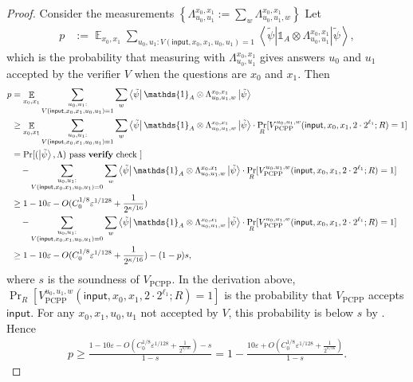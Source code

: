 \documentclass[10pt,a4paper]{article}
\def\V{\CMcal{V}}
\theoremstyle{plain}
\theoremstyle{definition}
\newcommand {\set} [1] {\ensuremath{ \left\lbrace #1 \right\rbrace }}
\newcommand {\bra} [1] {\ensuremath{ \left\langle #1 \right| }}
\newcommand {\ket} [1] {\ensuremath{ \left| #1 \right\rangle }}
\DeclareMathOperator*{\bigE}{\mathbb{E}}
\newcommand {\id} {\ensuremath{\mathds{1}}}
\newcommand{\ep} {\ensuremath{\varepsilon}}
\newcommand{\x}{\otimes}
\newcommand{\1}{\mathbb{1}} %
\newcommand{\tpsi}{\tilde{\psi}}
\newcommand{\PCPP}{\mathrm{PCPP}}
\newcommand{\ipt}{\mathsf{input}}
\begin{document}
\begin{proof}
Consider the measurements $\set{ \Lambda^{x_0, x_1}_{u_0, u_1} := \sum_w \Lambda^{x_0,x_1}_{u_0,u_1,w}}$
Let
\begin{align*}
	p &:= \bigE_{x_0,x_1} \sum_{u_0, u_1: V(\ipt, x_0,x_1,u_0,u_1)=1} \bra{\tpsi} \id_A \x \Lambda^{x_0,x_1}_{u_0,u_1} \ket{\tpsi},
\end{align*}
which is the probability that measuring with $\Lambda^{x_0, x_1}_{u_0, u_1}$ gives answers 
$u_0$ and $u_1$ accepted by the verifier $V$ when the questions are $x_0$ and $x_1$.
Then
\begin{align*}
	 p &= \bigE_{x_0,x_1} \sum_{\substack{u_0,u_1: \\ V(\ipt, x_0,x_1,u_0,u_1)=1}}
	 \sum_{w}
	   \bra{\tpsi} \id_A \x \Lambda^{x_0,x_1}_{u_0,u_1,w} \ket{\tpsi} \\
	&\geq \bigE_{x_0,x_1} \sum_{\substack{u_0,u_1: \\ V(\ipt, x_0,x_1,u_0,u_1)=1}}
	 \sum_{w} \bra{\tpsi} \id_A \x \Lambda^{x_0,x_1}_{u_0,u_1,w} \ket{\tpsi} \cdot 
	\Pr_R[V_{\PCPP}^{u_0,u_1,w}(\ipt,x_0,x_1,2\cdot 2^{\ell_1}; R)=1]\\
	&= \Pr[(\ket{\tpsi}, \Lambda) \text{ pass \textbf{verify} check }]  \\
	&\quad-  \sum_{\substack{u_0,u_1: \\V(\ipt, x_0,x_1,u_0,u_1)=0}} \sum_w\bra{\tpsi} \id_A \x \Lambda^{x_0,x_1}_{u_0,u_1,w} \ket{\tpsi} \cdot 
	\Pr_R[V^{u_0,u_1,w}_{\PCPP}(\ipt, x_0, x_1, 2\cdot 2^{\ell_1}; R)=1]\\
	&\geq 1 - 10 \ep - O(C_0^{1/8}\ep^{1/128} + \frac{1}{2^{\kappa/16}}) \\
	&\quad - \sum_{\substack{u_0,u_1:\\ V(\ipt, x_0,x_1,u_0,u_1)=0}} \sum_w \bra{\tpsi}  \id_A \x \Lambda^{x_0,x_1}_{u_0,u_1,w} \ket{\tpsi} \cdot 
	\Pr_R[V^{u_0,u_1,w}_{\PCPP}(\ipt,x_0,x_1,2\cdot 2^{\ell_1};R)=1] \\
	&\geq 1 - 10 \ep - O(C_0^{1/8}\ep^{1/128} + \frac{1}{2^{\kappa/16}}) - (1-p)s,
\end{align*}
where $s$ is the soundness of $V_{\PCPP}$.
In the derivation above, $\Pr_R[V^{u_0,u_1,w}_{\PCPP}(\ipt, x_0, x_1, 2\cdot 2^{\ell_1}; R)=1]$ is the probability that $V_{\PCPP}$
accepts $\ipt$.
For any $x_0,x_1,u_0,u_1$ not accepted by $V$, this probability is below $s$ by \cite[Proposition 17.8]{neexp}.
Hence
\begin{align*}
	p \geq \frac{ 1 - 10 \ep -O(C_0^{1/8}\ep^{1/128} + \frac{1}{2^{\kappa/16}}) - s }{1 - s} = 1 - \frac{10\ep+O(C_0^{1/8}\ep^{1/128} + \frac{1}{2^{\kappa/16}}) }{1 - s}.
\end{align*}


\end{proof}
\end{document}
